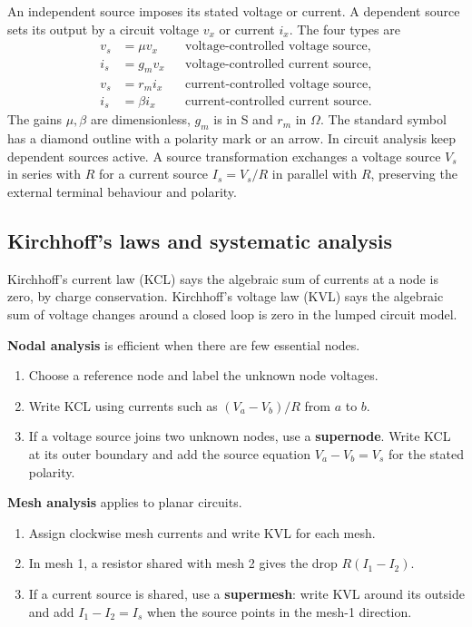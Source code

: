 \documentclass[12pt,a4paper]{article}
\begin{document}
An independent source imposes its stated voltage or current. A dependent source sets its output by a circuit voltage \(v_x\) or current \(i_x\). The four types are
\[
\begin{aligned}
v_s&=\mu v_x &&\text{voltage-controlled voltage source},\\
i_s&=g_m v_x &&\text{voltage-controlled current source},\\
v_s&=r_m i_x &&\text{current-controlled voltage source},\\
i_s&=\beta i_x &&\text{current-controlled current source}.
\end{aligned}
\]
The gains \(\mu,\beta\) are dimensionless, \(g_m\) is in S and \(r_m\) in \(\Omega\). The standard symbol has a diamond outline with a polarity mark or an arrow. In circuit analysis keep dependent sources active. A source transformation exchanges a voltage source \(V_s\) in series with \(R\) for a current source \(I_s=V_s/R\) in parallel with \(R\), preserving the external terminal behaviour and polarity.

\subsection{Kirchhoff's laws and systematic analysis}
\begin{tcolorbox}[defbox,title={KCL and KVL}]
Kirchhoff's current law (KCL) says the algebraic sum of currents at a node is zero, by charge conservation. Kirchhoff's voltage law (KVL) says the algebraic sum of voltage changes around a closed loop is zero in the lumped circuit model.
\end{tcolorbox}

\textbf{Nodal analysis} is efficient when there are few essential nodes.
\begin{enumerate}[leftmargin=*, itemsep=3pt, topsep=4pt]
  \item Choose a reference node and label the unknown node voltages.
  \item Write KCL using currents such as \((V_a-V_b)/R\) from \(a\) to \(b\).
  \item If a voltage source joins two unknown nodes, use a \textbf{supernode}. Write KCL at its outer boundary and add the source equation \(V_a-V_b=V_s\) for the stated polarity.
\end{enumerate}

\textbf{Mesh analysis} applies to planar circuits.
\begin{enumerate}[leftmargin=*, itemsep=3pt, topsep=4pt]
  \item Assign clockwise mesh currents and write KVL for each mesh.
  \item In mesh 1, a resistor shared with mesh 2 gives the drop \(R(I_1-I_2)\).
  \item If a current source is shared, use a \textbf{supermesh}: write KVL around its outside and add \(I_1-I_2=I_s\) when the source points in the mesh-1 direction.
\end{enumerate}
\end{document}
